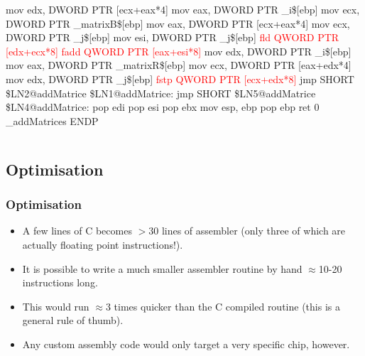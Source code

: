 \documentclass[smaller,table]{beamer} %
\begin{document}
\begin{frame}[fragile]
\begin{columns}
\begin{column}{5cm}
\begin{semiverbatim}
        mov     edx, DWORD PTR [ecx+eax*4]
        mov     eax, DWORD PTR \_i\$[ebp]
        mov     ecx, DWORD PTR \_matrixB\$[ebp]
        mov     eax, DWORD PTR [ecx+eax*4]
        mov     ecx, DWORD PTR \_j\$[ebp]
        mov     esi, DWORD PTR \_j\$[ebp]
\textcolor{red}{        fld     QWORD PTR [edx+ecx*8]}
\textcolor{red}{        fadd    QWORD PTR [eax+esi*8]}
        mov     edx, DWORD PTR \_i\$[ebp]
        mov     eax, DWORD PTR \_matrixR\$[ebp]
        mov     ecx, DWORD PTR [eax+edx*4]
        mov     edx, DWORD PTR \_j\$[ebp]
\textcolor{red}{        fstp    QWORD PTR [ecx+edx*8]}
        jmp     SHORT \$LN2@addMatrice
\$LN1@addMatrice:
        jmp     SHORT \$LN5@addMatrice
\$LN4@addMatrice:
        pop     edi
        pop     esi
        pop     ebx
        mov     esp, ebp
        pop     ebp
        ret     0
\_addMatrices ENDP
\end{semiverbatim}
\end{column}
\end{columns}
\end{frame}

\subsection{Optimisation}
\begin{frame}
\frametitle{Optimisation}
\begin{itemize}
\item A few lines of C becomes $>30$ lines of assembler (only three of which are actually floating point instructions!).
\item It is possible to write a much smaller assembler routine by hand $\approx$10-20 instructions long.
\item This would run $\approx$3 times quicker than the C compiled routine (this is a general rule of thumb).
\item Any custom assembly code would only target a very specific chip, however.
\end{itemize}
\end{frame}
\end{document}
